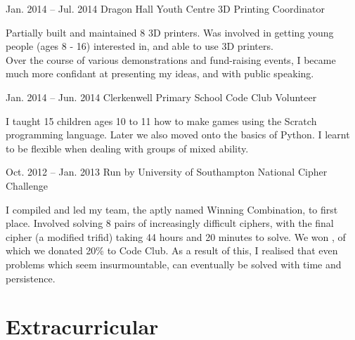 \documentclass{tccv}
\begin{document}
\begin{eventlist}
        \item{Jan. 2014 -- Jul. 2014}
             {Dragon Hall Youth Centre}
             {3D Printing Coordinator}

        Partially built and maintained 8 3D printers. Was involved in getting young people (ages 8 - 16) interested in, and able to use 3D printers.\\
        Over the course of various demonstrations and fund-raising events, I became much more confidant at presenting my ideas, and with public speaking.

        \item{Jan. 2014 -- Jun. 2014}
             {Clerkenwell Primary School}
             {Code Club Volunteer}

        I taught 15 children ages 10 to 11 how to make games using the Scratch programming language. Later we also moved onto the basics of Python. I learnt to be flexible when dealing with groups of mixed ability.

        \item{Oct. 2012 -- Jan. 2013}
             {Run by University of Southampton}
             {National Cipher Challenge}

        I compiled and led my team, the aptly named Winning Combination, to first place. Involved solving 8 pairs of increasingly difficult ciphers, with the final cipher (a modified trifid) taking 44 hours and 20 minutes to solve. We won , of which we donated 20\% to Code Club. As a result of this, I realised that even problems which seem insurmountable, can eventually be solved with time and persistence.

    \end{eventlist}



\section{Extracurricular}
\end{document}
